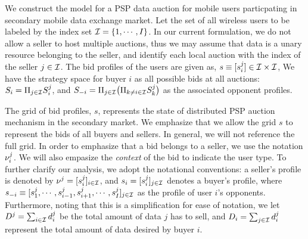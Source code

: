We construct the model for a PSP data auction for mobile users
particpating in secondary mobile data exchange market.
Let the set of all wireless users to be labeled by
the index set $\mathcal{I} = \lbrace 1, \cdots, I\rbrace$. In our current formulation, we do not allow a seller to host multiple
auctions, thus we may assume that data is a unary resource belonging to the seller, and
identify each local auction with the index of the seller
$j\in\mathcal{I}$. The bid profiles of the users are given as,
$s \equiv
[s_i^j] \in \mathcal{I} \times \mathcal{I}$,  
We have the strategy space for buyer $i$ as all possible bids at all auctions:
$S_i=\Pi_{j\in\mathcal{I}} S_i^j$, and $S_{-i} =\Pi_{j\in\mathcal{I}} \big( \Pi_{k\ne
i\in\mathcal{I}} S_k^j\big)$ as the
associated opponent profiles. 

The grid of bid profiles, $s$, represents the state of distributed PSP auction
mechanism in the secondary market. 
We emphasize that we allow the grid $s$ to represent the bids of all buyers and
sellers. In general, we will not reference the full grid. In order to emphasize
that a bid belongs to a seller, we use the notation $\nu_i^j$. We
will also empasize the \emph{context} of the bid to indicate the user type.
To further clarify our analysis, we adopt the notational conventions: a
seller's profile is denoted by $\nu^j = [s_i^j]_{i\in\mathcal{I}}$, and $s_i =
[s_i^j]_{j\in\mathcal{I}}$ denotes a buyer's profile, where $s_{-i} \equiv [s_1^j , \cdots , s_{i-1}^j , s_{i+1}^j , \cdots
, s_I^j]_{j\in\mathcal{I}}$ as the profile of user $i$'s opponents.
Furthermore, noting that this is a simplification for ease of notation, we let
$D^j = \sum_{i\in\mathcal{I}} d_i^j$ be the total amount of data $j$ has to sell, and
$D_i = \sum_{j\in\mathcal{I}} d_i^j$ represent the total amount of data desired by buyer $i$. 

